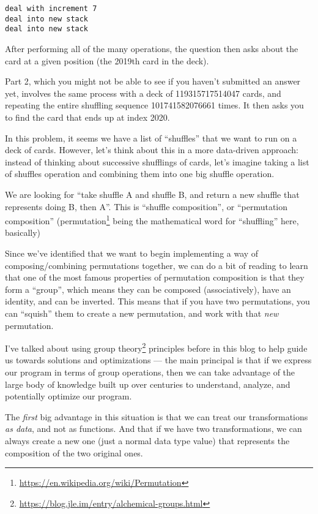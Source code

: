 \documentclass[]{article}
\renewcommand{\href}[2]{#2\footnote{\url{#1}}}
\begin{document}
\begin{verbatim}
deal with increment 7
deal into new stack
deal into new stack
\end{verbatim}

After performing all of the many operations, the question then asks about the
card at a given position (the 2019th card in the deck).

Part 2, which you might not be able to see if you haven't submitted an answer
yet, involves the same process with a deck of 119315717514047 cards, and
repeating the entire shuffling sequence 101741582076661 times. It then asks you
to find the card that ends up at index 2020.

In this problem, it seems we have a list of ``shuffles'' that we want to run on
a deck of cards. However, let's think about this in a more data-driven approach:
instead of thinking about successive shufflings of cards, let's imagine taking a
list of shuffles operation and combining them into one big shuffle operation.

We are looking for ``take shuffle A and shuffle B, and return a new shuffle that
represents doing B, then A''. This is ``shuffle composition'', or ``permutation
composition'' (\href{https://en.wikipedia.org/wiki/Permutation}{permutation}
being the mathematical word for ``shuffling'' here, basically)

Since we've identified that we want to begin implementing a way of
composing/combining permutations together, we can do a bit of reading to learn
that one of the most famous properties of permutation composition is that they
form a ``group'', which means they can be composed (associatively), have an
identity, and can be inverted. This means that if you have two permutations, you
can ``squish'' them to create a new permutation, and work with that \emph{new}
permutation.

I've talked about \href{https://blog.jle.im/entry/alchemical-groups.html}{using
group theory} principles before in this blog to help guide us towards solutions
and optimizations --- the main principal is that if we express our program in
terms of group operations, then we can take advantage of the large body of
knowledge built up over centuries to understand, analyze, and potentially
optimize our program.

The \emph{first} big advantage in this situation is that we can treat our
transformations \emph{as data}, and not as functions. And that if we have two
transformations, we can always create a new one (just a normal data type value)
that represents the composition of the two original ones.
\end{document}
